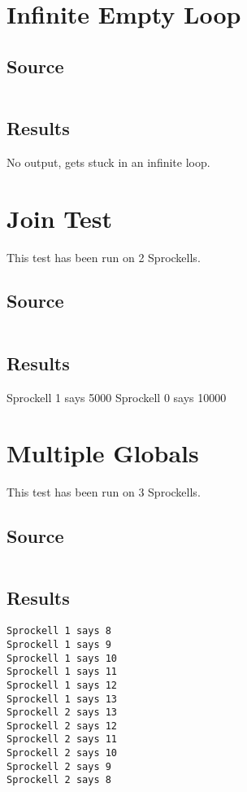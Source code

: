 \documentclass[twoside]{report}
\begin{document}
\section{Infinite Empty Loop}
\subsection{Source}
\inputminted[tabsize=4,linenos,firstnumber=1]{text}{../../src/haskell/PP-project-2017/test/infinite_loop.shl}
\subsection{Results}
No output, gets stuck in an infinite loop.

\section{Join Test}
This test has been run on 2 Sprockells.
\subsection{Source}
\inputminted[tabsize=4,linenos,firstnumber=1]{text}{../../src/haskell/PP-project-2017/test/join_test.shl}
\subsection{Results}
Sprockell 1 says 5000
Sprockell 0 says 10000

\section{Multiple Globals}
This test has been run on 3 Sprockells.
\subsection{Source}
\inputminted[tabsize=4,linenos,firstnumber=1]{text}{../../src/haskell/PP-project-2017/test/multiple_globals.shl}
\subsection{Results}
\begin{verbatim}
Sprockell 1 says 8
Sprockell 1 says 9
Sprockell 1 says 10
Sprockell 1 says 11
Sprockell 1 says 12
Sprockell 1 says 13
Sprockell 2 says 13
Sprockell 2 says 12
Sprockell 2 says 11
Sprockell 2 says 10
Sprockell 2 says 9
Sprockell 2 says 8
\end{verbatim}
\end{document}
